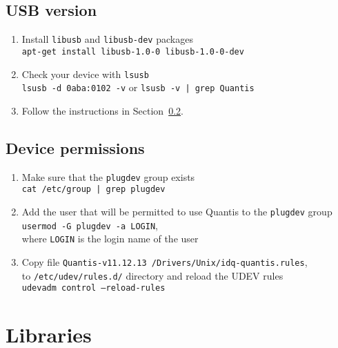\documentclass[a4paper,11pt]{article}
\newcommand{\QuantisDistVersion}{Quantis-v11.12.13}
\begin{document}
\subsection{USB version}
\begin{enumerate}
    \item Install \texttt{libusb} and \texttt{libusb-dev} packages\\ 
    \texttt{apt-get install libusb-1.0-0 libusb-1.0-0-dev}

    \item Check your device with \texttt{lsusb}\\
    \texttt{lsusb -d 0aba:0102 -v} or \texttt{lsusb -v | grep Quantis}

    \item Follow the instructions in Section~\ref{sec:permissions}.
\end{enumerate}


\subsection{Device permissions}\label{sec:permissions}
\begin{enumerate}
    \item Make sure that the \texttt{plugdev} group exists\\
    \texttt{cat /etc/group | grep plugdev}
    \item Add the user that will be permitted to use Quantis to the
    \texttt{plugdev} group\\ \texttt{usermod -G plugdev -a LOGIN},\\ where
    \texttt{LOGIN} is the login name of the user
    \item Copy file \texttt{\QuantisDistVersion
    /Drivers/Unix/idq-quantis.rules},\\ to \texttt{/etc/udev/rules.d/} directory
    and reload the UDEV rules\\ \texttt{udevadm control --reload-rules}
\end{enumerate}

\section{Libraries}
\end{document}
